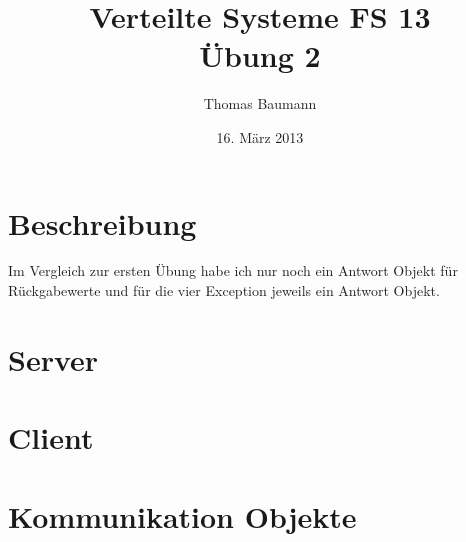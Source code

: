 \documentclass[10pt]{article}
\title{
	\vspace{5cm}
	Verteilte Systeme FS 13\\
	Übung 2
}
\author{Thomas Baumann}
\date{16. März 2013}
\let\stdsection\section{}
\renewcommand{\section}{\newpage\stdsection}
\begin{document}
\maketitle
\thispagestyle{fancy}

\newpage

\tableofcontents	  	


\newpage
\setcounter{page}{1}

\section{Beschreibung}
Im Vergleich zur ersten Übung habe ich nur noch ein Antwort Objekt für Rückgabewerte und für die vier Exception jeweils ein Antwort Objekt.

\section{Server}



\section{Client}



\section{Kommunikation Objekte}
\end{document}

